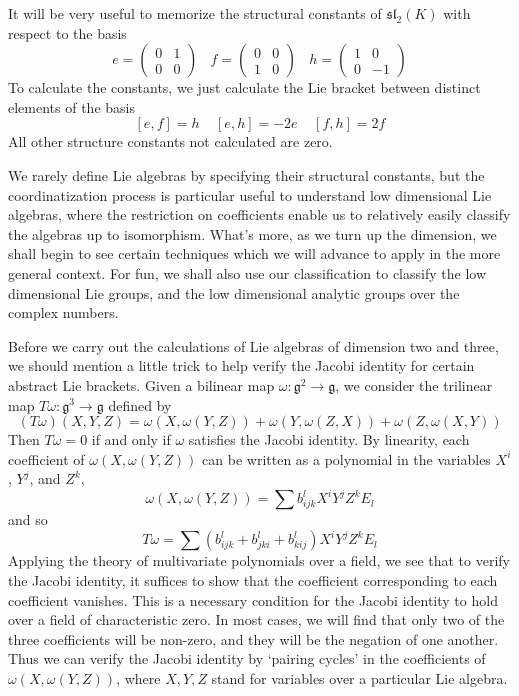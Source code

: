 \begin{example}
    It will be very useful to memorize the structural constants of $\mathfrak{sl}_2(K)$ with respect to the basis
    \[ e = \begin{pmatrix} 0 & 1 \\ 0 & 0 \end{pmatrix}\ \ \ \ f = \begin{pmatrix} 0 & 0 \\ 1 & 0 \end{pmatrix}\ \ \ \ h = \begin{pmatrix} 1 & 0 \\ 0 & -1 \end{pmatrix} \]
    To calculate the constants, we just calculate the Lie bracket between distinct elements of the basis
    \[ [e,f] = h\ \ \ \ \ [e,h] = -2e\ \ \ \ \ [f,h] = 2f \]
    All other structure constants not calculated are zero.
\end{example}

We rarely define Lie algebras by specifying their structural constants, but the coordinatization process is particular useful to understand low dimensional Lie algebras, where the restriction on coefficients enable us to relatively easily classify the algebras up to isomorphism. What's more, as we turn up the dimension, we shall begin to see certain techniques which we will advance to apply in the more general context. For fun, we shall also use our classification to classify the low dimensional Lie groups, and the low dimensional analytic groups over the complex numbers.

Before we carry out the calculations of Lie algebras of dimension two and three, we should mention a little trick to help verify the Jacobi identity for certain abstract Lie brackets. Given a bilinear map $\omega: \mathfrak{g}^2 \to \mathfrak{g}$, we consider the trilinear map $T\omega: \mathfrak{g}^3 \to \mathfrak{g}$ defined by
%
\[ (T \omega)(X,Y,Z) = \omega(X, \omega(Y,Z)) + \omega(Y,\omega(Z,X)) + \omega(Z,\omega(X,Y)) \]
%
Then $T \omega = 0$ if and only if $\omega$ satisfies the Jacobi identity. By linearity, each coefficient of $\omega(X,\omega(Y,Z))$ can be written as a polynomial in the variables $X^i$, $Y^j$, and $Z^k$,
%
\[ \omega(X, \omega(Y,Z)) = \sum b_{ijk}^l X^i Y^j Z^k E_l \]
%
and so
%
\[ T\omega = \sum (b_{ijk}^l + b_{jki}^l + b_{kij}^l) X^i Y^j Z^k E_l \]
%
Applying the theory of multivariate polynomials over a field, we see that to verify the Jacobi identity, it suffices to show that the coefficient corresponding to each coefficient vanishes. This is a necessary condition for the Jacobi identity to hold over a field of characteristic zero. In most cases, we will find that only two of the three coefficients will be non-zero, and they will be the negation of one another. Thus we can verify the Jacobi identity by `pairing cycles' in the coefficients of $\omega(X,\omega(Y,Z))$, where $X,Y,Z$ stand for variables over a particular Lie algebra.

